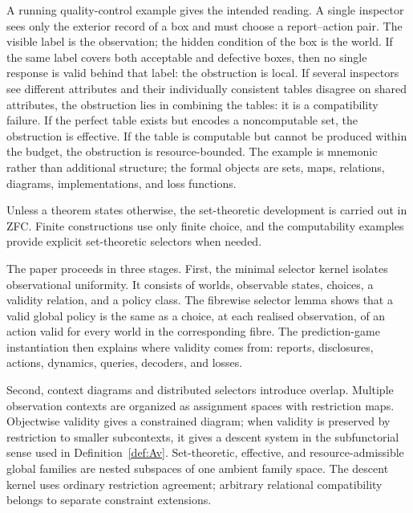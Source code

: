 \documentclass[11pt]{article}
\theoremstyle{plain}
\theoremstyle{definition}
\theoremstyle{remark}
\begin{document}
A running quality-control example gives the intended reading. A single inspector
sees only the exterior record of a box and must choose a report--action pair. The
visible label is the observation; the hidden condition of the box is the world.
If the same label covers both acceptable and defective boxes, then no single
response is valid behind that label: the obstruction is local. If several
inspectors see different attributes and their individually consistent tables
disagree on shared attributes, the obstruction lies in combining the tables: it
is a compatibility failure. If the perfect table exists but encodes a
noncomputable set, the obstruction is effective. If the table is computable but
cannot be produced within the budget, the obstruction is resource-bounded. The
example is mnemonic rather than additional structure; the formal objects are
sets, maps, relations, diagrams, implementations, and loss functions.

Unless a theorem states otherwise, the set-theoretic development is carried out
in ZFC. Finite constructions use only finite choice, and the computability
examples provide explicit set-theoretic selectors when needed.

The paper proceeds in three stages. First, the minimal selector kernel isolates
observational uniformity. It consists of worlds, observable states, choices, a
validity relation, and a policy class. The fibrewise selector lemma shows that a
valid global policy is the same as a choice, at each realised observation, of an
action valid for every world in the corresponding fibre. The prediction-game
instantiation then explains where validity comes from: reports, disclosures,
actions, dynamics, queries, decoders, and losses.

Second, context diagrams and distributed selectors introduce overlap. Multiple
observation contexts are organized as assignment spaces with restriction maps.
Objectwise validity gives a constrained diagram; when validity is preserved by
restriction to smaller subcontexts, it gives a descent system in the
subfunctorial sense used in Definition~\ref{def:Av}. Set-theoretic, effective,
and resource-admissible global families are nested subspaces of one ambient
family space. The descent kernel uses ordinary restriction agreement; arbitrary
relational compatibility belongs to separate constraint extensions.
\end{document}
